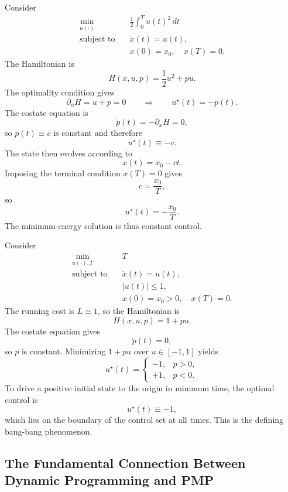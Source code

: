 \begin{eg}
	Consider
	\begin{align*}
		\min_{u(\cdot)} \quad & \frac{1}{2}\int_0^T u(t)^2\,dt \\
		\text{subject to}\quad & \dot x(t)=u(t), \\
		                       & x(0)=x_0,\quad x(T)=0.
	\end{align*}
	The Hamiltonian is
	\[
		H(x,u,p)=\frac{1}{2}u^2+pu.
	\]
	The optimality condition gives
	\[
		\partial_u H=u+p=0
		\qquad \Longrightarrow \qquad
		u^\star(t)=-p(t).
	\]
	The costate equation is
	\[
		\dot p(t)=-\partial_x H=0,
	\]
	so $p(t)\equiv c$ is constant and therefore
	\[
		u^\star(t)\equiv -c.
	\]
	The state then evolves according to
	\[
		x(t)=x_0-ct.
	\]
	Imposing the terminal condition $x(T)=0$ gives
	\[
		c=\frac{x_0}{T},
	\]
	so
	\[
		u^\star(t)=-\frac{x_0}{T}.
	\]
	The minimum-energy solution is thus constant control.
\end{eg}

\begin{eg}
	Consider
	\begin{align*}
		\min_{u(\cdot),T} \quad & T \\
		\text{subject to}\quad & \dot x(t)=u(t), \\
		                       & |u(t)|\le 1, \\
		                       & x(0)=x_0>0,\quad x(T)=0.
	\end{align*}
	The running cost is $L \equiv 1$, so the Hamiltonian is
	\[
		H(x,u,p)=1+pu.
	\]
	The costate equation gives
	\[
		\dot p(t)=0,
	\]
	so $p$ is constant. Minimizing $1+pu$ over $u \in [-1,1]$ yields
	\[
		u^\star(t)=
		\begin{cases}
			-1, & p>0, \\
			+1, & p<0.
		\end{cases}
	\]
	To drive a positive initial state to the origin in minimum time, the optimal control is
	\[
		u^\star(t)\equiv -1,
	\]
	which lies on the boundary of the control set at all times. This is the defining bang-bang phenomenon.
\end{eg}

\subsection{The Fundamental Connection Between Dynamic Programming and PMP}
\label{sec:l4-the-fundamental-connection-between-dynamic-programming-and-pmp}

